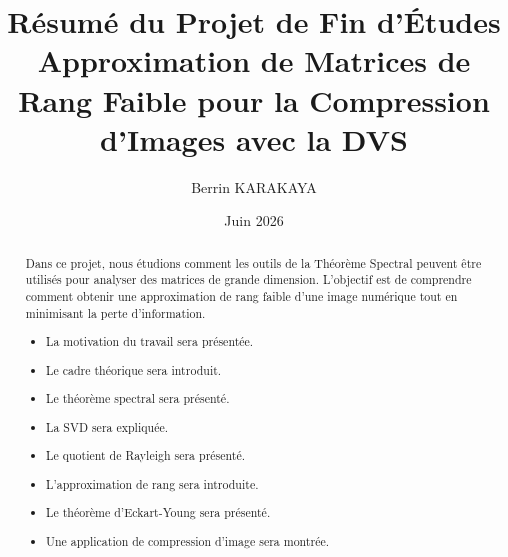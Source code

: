 \documentclass[11pt, a4paper]{article}
\title{\textbf{Résumé du Projet de Fin d'Études} \\ \large Approximation de Matrices de Rang Faible pour la Compression d'Images avec la DVS}
\author{Berrin KARAKAYA}
\date{Juin 2026}
\begin{document}
\maketitle

\vspace{1cm}

\begin{abstract}
    \noindent Dans ce projet, nous étudions comment les outils de la Théorème Spectral peuvent être utilisés pour analyser des matrices de grande dimension. L'objectif est de comprendre comment obtenir une approximation de rang faible d'une image numérique tout en minimisant la perte d'information.

    \begin{itemize}
        \item La motivation du travail sera présentée.
        \item Le cadre théorique sera introduit.
        \item Le théorème spectral sera présenté.
        \item La SVD sera expliquée.
        \item Le quotient de Rayleigh sera présenté.
        \item L’approximation de rang sera introduite.
        \item Le théorème d’Eckart-Young sera présenté.
        \item Une application de compression d’image sera montrée.
    \end{itemize}
\end{abstract}
\end{document}
